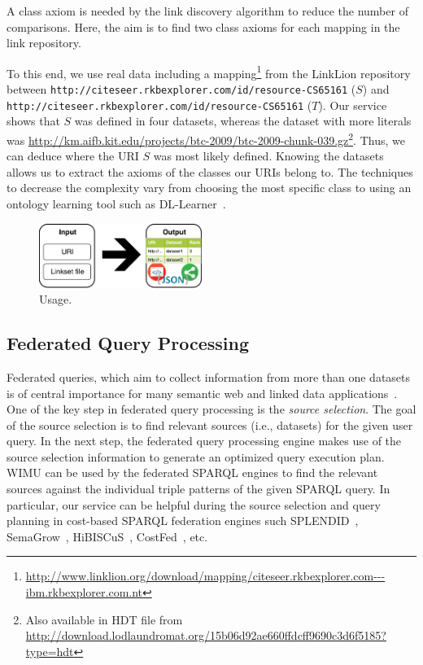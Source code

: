A class axiom is needed by the link discovery algorithm to reduce the number of comparisons. 
Here, the aim is to find two class axioms for each mapping in the link repository.

To this end, we use real data including a mapping\footnote{\url{http://www.linklion.org/download/mapping/citeseer.rkbexplorer.com---ibm.rkbexplorer.com.nt}} from the Link\-Lion repository~\cite{linklion2014} between \texttt{http://citeseer.rkbexplorer.com/id/resource-CS65161} ($S$) and \texttt{http://citeseer.rkbexplorer.com/id/resource-CS65161} ($T$). 
Our service shows that $S$ was defined in four datasets, whereas the dataset with more literals was \url{http://km.aifb.kit.edu/projects/btc-2009/btc-2009-chunk-039.gz}\footnote{Also available in HDT file from \url{http://download.lodlaundromat.org/15b06d92ae660ffdcff9690c3d6f5185?type=hdt}}. 
Thus, we can deduce where the URI $S$ was most likely defined.
Knowing the datasets allows us to extract the axioms of the classes our URIs belong to.
The techniques to decrease the complexity vary from choosing the most specific class to using an ontology learning tool such as DL-Learner~\cite{lehmann2009dl}.

\begin{figure}[htb] 
	\centering
	\includegraphics[width=150pt]{img/usage.pdf}
	\caption{Usage.}
	\label{fig:usage}
\end{figure}

\subsection{Federated Query Processing}
Federated queries, which aim to collect information from more than one datasets is of central importance for many semantic web and linked data applications~\cite{saleem2013fostering,bigtcga2014}. One of the key step in federated query processing is the \emph{source selection}. The goal of the source selection is to find relevant sources (i.e., datasets) for the given user query. In the next step, the federated query processing engine makes use of the source selection information to generate an optimized query execution plan. WIMU can be used by the federated SPARQL engines to find the relevant sources against the individual triple patterns of the given SPARQL query. In particular, our service can be helpful during the source selection and query planning in cost-based SPARQL federation engines such SPLENDID~\cite{splendid2011}, SemaGrow~\cite{semagrow2015}, HiBISCuS~\cite{hibiscus2014}, CostFed~\cite{costfed2017}, etc.  


